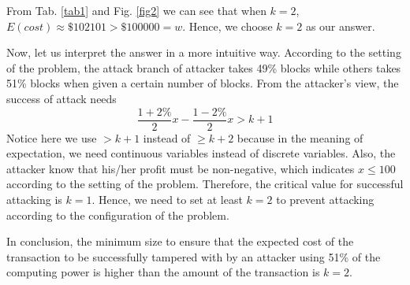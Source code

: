 \documentclass{oxmathproblems}
\makeatletter
\theoremstyle{definition}
\renewenvironment{solution}[1][Solution] {\par\pushQED{\qed}\normalfont\topsep6\p@\@plus6\p@\relax\trivlist\item[\hskip\labelsep\bfseries#1\@addpunct{.}]\ignorespaces}{\popQED\endtrivlist\@endpefalse} \makeatother
\makeatother
\begin{document}
\begin{solution}
	From Tab. \ref{tab1} and Fig. \ref{fig2} we can see that when $k = 2$, $E(cost) \approx \$102101 > \$100000 = w$. Hence, we choose $k = 2$ as our answer.

	Now, let us interpret the answer in a more intuitive way. According to the setting of the problem, the attack branch of attacker takes 49\% blocks while others takes 51\% blocks when given a certain number of blocks. From the attacker's view, the success of attack needs
	$$
	\frac{1 + 2\%}{2}x - \frac{1 - 2\%}{2}x > k + 1
	$$
	Notice here we use $> k + 1$ instead of $\ge k + 2$ because in the meaning of expectation, we need continuous variables instead of discrete variables. Also, the attacker know that his/her profit must be non-negative, which indicates $x \leq 100$ according to the setting of the problem. Therefore, the critical value for successful attacking is $k = 1$. Hence, we need to set at least $k = 2$ to prevent attacking according to the configuration of the problem.

	In conclusion, the minimum size to ensure that the expected cost of the transaction to be successfully tampered with by an attacker using 51\% of the computing power is higher than the amount of the transaction is $k = 2$.
\end{solution}
\end{document}
